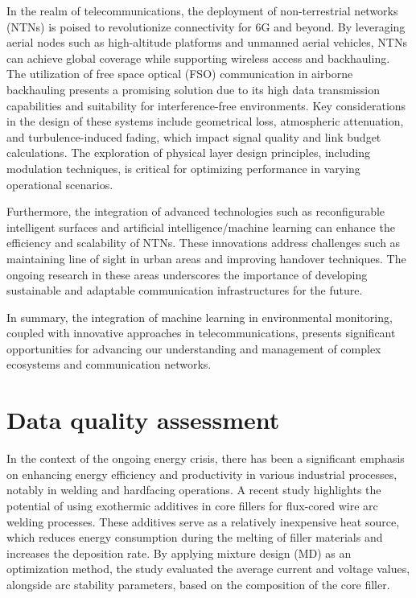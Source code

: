 \documentclass[runningheads]{llncs}
\begin{document}
In the realm of telecommunications, the deployment of non-terrestrial networks (NTNs) is poised to revolutionize connectivity for 6G and beyond. By leveraging aerial nodes such as high-altitude platforms and unmanned aerial vehicles, NTNs can achieve global coverage while supporting wireless access and backhauling. The utilization of free space optical (FSO) communication in airborne backhauling presents a promising solution due to its high data transmission capabilities and suitability for interference-free environments. Key considerations in the design of these systems include geometrical loss, atmospheric attenuation, and turbulence-induced fading, which impact signal quality and link budget calculations. The exploration of physical layer design principles, including modulation techniques, is critical for optimizing performance in varying operational scenarios.

Furthermore, the integration of advanced technologies such as reconfigurable intelligent surfaces and artificial intelligence/machine learning can enhance the efficiency and scalability of NTNs. These innovations address challenges such as maintaining line of sight in urban areas and improving handover techniques. The ongoing research in these areas underscores the importance of developing sustainable and adaptable communication infrastructures for the future.

In summary, the integration of machine learning in environmental monitoring, coupled with innovative approaches in telecommunications, presents significant opportunities for advancing our understanding and management of complex ecosystems and communication networks.
\section{Data quality assessment}
In the context of the ongoing energy crisis, there has been a significant emphasis on enhancing energy efficiency and productivity in various industrial processes, notably in welding and hardfacing operations. A recent study highlights the potential of using exothermic additives in core fillers for flux-cored wire arc welding processes. These additives serve as a relatively inexpensive heat source, which reduces energy consumption during the melting of filler materials and increases the deposition rate. By applying mixture design (MD) as an optimization method, the study evaluated the average current and voltage values, alongside arc stability parameters, based on the composition of the core filler. 
\end{document}
